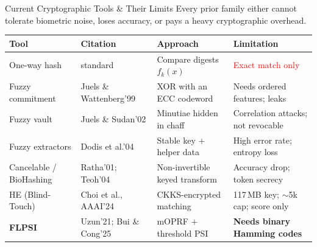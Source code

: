 \documentclass{beamer}
\begin{document}
\begin{frame}{Current Cryptographic Tools \& Their Limits}
  \centering
  {\footnotesize Every prior family either \alert{cannot tolerate biometric noise},
  \alert{loses accuracy}, or \alert{pays a heavy cryptographic overhead}.}
  \vspace{0.15cm}

  \begin{table}
    \centering
    \scriptsize
    \setlength{\extrarowheight}{2pt}
    \begin{tabular}{@{}L{1.75cm}L{2.05cm}L{2.75cm}L{3.05cm}@{}}
      \toprule
      \textbf{Tool} & \textbf{Citation} & \textbf{Approach} & \textbf{Limitation} \\
      \midrule
      One-way hash & standard & Compare digests $f_k(x)$ & \textcolor{red}{Exact match only} \\
      Fuzzy commitment & Juels \& Wattenberg'99 & XOR with an ECC codeword & Needs ordered features; leaks \\
      Fuzzy vault & Juels \& Sudan'02 & Minutiae hidden in chaff & Correlation attacks; not revocable \\
      Fuzzy extractors & Dodis et al.'04 & Stable key $+$ helper data & High error rate; entropy loss \\
      Cancelable / BioHashing & Ratha'01; Teoh'04 & Non-invertible keyed transform & Accuracy drop; token secrecy \\
      HE (Blind-Touch) & Choi et al., AAAI'24 & CKKS-encrypted matching & 117\,MB key; $\sim$5k cap; score only \\
      \textbf{FLPSI} & Uzun'21; Bui \& Cong'25 & mOPRF $+$ threshold PSI & \textbf{Needs binary Hamming codes} \\
      \bottomrule
    \end{tabular}
  \end{table}
\end{frame}
\end{document}
